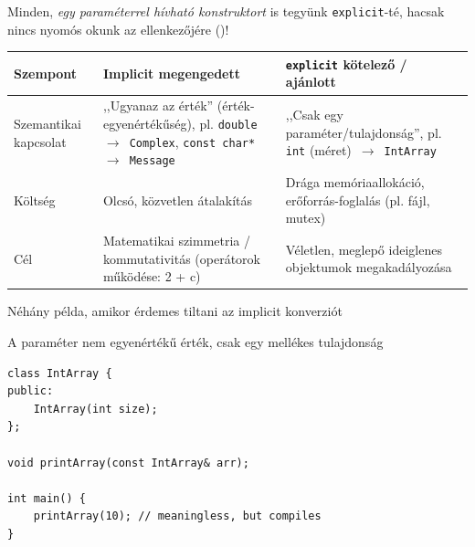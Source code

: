 \documentclass[usenames,dvipsnames,aspectratio=169]{beamer}
\begin{document}
\begin{frame}
    \begin{exampleblock}{}
        \vspace{-.2cm}
        
        
        
        
        
        \vspace{-.2cm}
    \end{exampleblock}
\end{frame}

\begin{frame}
    Minden, \emph{egy paraméterrel hívható konstruktort} is tegyünk \texttt{explicit}-té, hacsak nincs nyomós okunk az ellenkezőjére ()!
    \vfill
    \begin{center}
    \begin{tabular}{p{2.5cm}p{5cm}p{5cm} }
        Szempont & Implicit megengedett & \texttt{explicit} kötelező / ajánlott \\
        \hline
        Szemantikai kapcsolat & ,,Ugyanaz az érték'' (érték-egyenértékűség), pl. \texttt{double}~$\to$~\texttt{Complex}, \texttt{const~char*}~$\to$~\texttt{Message} & ,,Csak egy paraméter/tulajdonság'', pl. \texttt{int} (méret)~$\to$~\texttt{IntArray} \\
        Költség & Olcsó, közvetlen átalakítás & Drága memóriaallokáció, erőforrás-foglalás (pl. fájl, mutex) \\
        Cél & Matematikai szimmetria / kommutativitás (operátorok működése: 2 + c) & Véletlen, meglepő ideiglenes objektumok megakadályozása \\
    \end{tabular}
    \end{center}
\end{frame}

\begin{frame}[fragile]
    Néhány példa, amikor érdemes tiltani az implicit konverziót
    \begin{alertblock}{A paraméter nem egyenértékű érték, csak egy mellékes tulajdonság}
        \begin{verbatim}
class IntArray {
public:
    IntArray(int size); 
};

void printArray(const IntArray& arr);

int main() {
    printArray(10); // meaningless, but compiles
}
\end{verbatim}
    \end{alertblock}
\end{frame}
\end{document}

